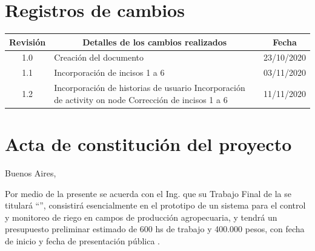 \documentclass[11pt]{charter}
\begin{document}
\maketitle
\thispagestyle{empty}
\pagebreak


\thispagestyle{empty}
{\setlength{\parskip}{0pt}
\tableofcontents{}
}
\pagebreak


\section{Registros de cambios}
\label{sec:registro}


\begin{table}[ht]
\label{tab:registro}
\centering
\begin{tabularx}{\linewidth}{@{}|c|X|c|@{}}
\hline
\rowcolor[HTML]{C0C0C0} 
Revisión & \multicolumn{1}{c|}{\cellcolor[HTML]{C0C0C0}Detalles de los cambios realizados} & Fecha      \\ \hline
1.0      & Creación del documento                                          & 23/10/2020 \\ \hline
1.1      & Incorporación de incisos 1 a 6                                  & 03/11/2020 \\ \hline
1.2      & Incorporación de historias de usuario \newline
		   Incorporación de activity on node \newline 									   
		   Corrección de incisos 1 a 6                           & 11/11/2020 \\ \hline
\end{tabularx}
\end{table}

\pagebreak



\section{Acta de constitución del proyecto}
\label{sec:acta}

\begin{flushright}
Buenos Aires, \fechaInicioName
\end{flushright}

\vspace{2cm}

Por medio de la presente se acuerda con el Ing. \authorname\hspace{1px} que su Trabajo Final de la \degreename\hspace{1px} se titulará ``\ttitle'', consistirá esencialmente en el prototipo de un sistema para el control y monitoreo de riego en campos de producción agropecuaria, y tendrá un presupuesto preliminar estimado de 600 hs de trabajo y 400.000 pesos, con fecha de inicio \fechaInicioName\hspace{1px} y fecha de presentación pública \fechaFinalName.
\end{document}
